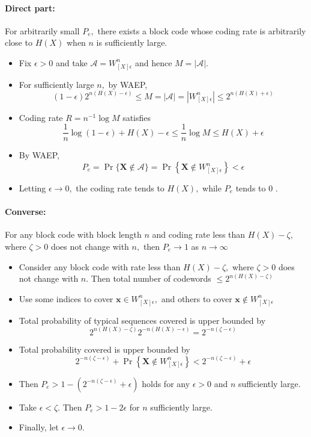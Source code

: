 \documentclass[8pt]{article}
\begin{document}
\paragraph{Direct part:} For arbitrarily small $P_{e},$ there exists a block code whose coding rate is arbitrarily close to $H(X)$ when $n$ is sufficiently large.
\begin{itemize}
	\item Fix $\epsilon>0$ and take $\mathcal{A}=W_{[X] \epsilon}^{n}$ and hence $M=|\mathcal{A}|$.
	\item For sufficiently large $n,$ by WAEP,
	$$
	(1-\epsilon) 2^{n(H(X)-\epsilon)} \leq M=|\mathcal{A}|=\left|W_{[X] \epsilon}^{n}\right| \leq 2^{n(H(X)+\epsilon)}
	$$
	\item Coding rate $R =n^{-1} \log M$ satisfies
	$$
	\frac{1}{n} \log (1-\epsilon)+H(X)-\epsilon \leq \frac{1}{n} \log M \leq H(X)+\epsilon
	$$
	\item By WAEP,
	$$
	P_{e}=\operatorname{Pr}\{\mathbf{X} \notin \mathcal{A}\}=\operatorname{Pr}\left\{\mathbf{X} \notin W_{[X] \epsilon}^{n}\right\}<\epsilon
	$$
	\item Letting $\epsilon \rightarrow 0,$ the coding rate tends to $H(X),$ while $P_{e}$ tends to 0 .
\end{itemize}
\paragraph{Converse:} For any block code with block length $n$ and coding rate less than $H(X)-\zeta,$ where $\zeta>0$ does not change with $n,$ then $P_{e} \rightarrow 1$ as
$n \rightarrow \infty$
\begin{itemize}
	\item Consider any block code with rate less than $H(X)-\zeta,$ where $\zeta>0$ does not change with $n .$ Then total number of codewords $\leq 2^{n(H(X)-\zeta)}$
	\item Use some indices to cover $\mathbf{x} \in W_{[X] \epsilon}^{n},$ and others to cover $\mathbf{x} \notin W_{[X] \epsilon}^{n}$
	\item Total probability of typical sequences covered is upper bounded by
	$$
	2^{n(H(X)-\zeta)} 2^{-n(H(X)-\epsilon)}=2^{-n(\zeta-\epsilon)}
	$$
	\item Total probability covered is upper bounded by
	$$
	2^{-n(\zeta-\epsilon)}+\operatorname{Pr}\left\{\mathbf{X} \notin W_{[X] \epsilon}^{n}\right\}<2^{-n(\zeta-\epsilon)}+\epsilon
	$$
	\item Then $P_{e}>1-\left(2^{-n(\zeta-\epsilon)}+\epsilon\right)$ holds for any $\epsilon>0$ and $n$ sufficiently large.
	\item Take $\epsilon<\zeta .$ Then $P_{e}>1-2 \epsilon$ for $n$ sufficiently large.
	\item Finally, let $\epsilon \rightarrow 0$.
\end{itemize}
\end{document}
